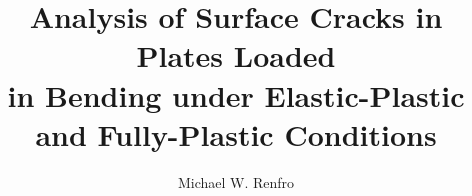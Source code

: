 \documentclass[twoside,10pt]{ttuthesis}
\author{Michael W. Renfro}
\title{Analysis of Surface Cracks in Plates Loaded \\
in Bending under Elastic-Plastic\\
and Fully-Plastic Conditions}
\begin{document}
\begin{Spacing}{1}
\tableofcontents*  %
\listoftables      %
\listoffigures     %
\renewcommand{\nomname}{LIST OF SYMBOLS}
\printnomenclature[0.5in] %
\end{Spacing}
\mainmatter







\appendix




\end{document}
